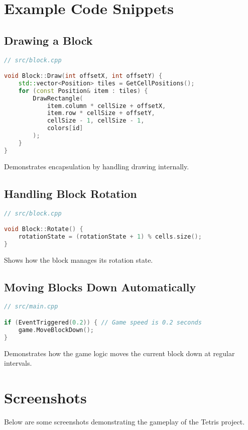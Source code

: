 \documentclass{article}
\begin{document}
\section{Example Code Snippets}

\subsection{Drawing a Block}

\begin{lstlisting}[language=C++]
// src/block.cpp

void Block::Draw(int offsetX, int offsetY) {
    std::vector<Position> tiles = GetCellPositions();
    for (const Position& item : tiles) {
        DrawRectangle(
            item.column * cellSize + offsetX,
            item.row * cellSize + offsetY,
            cellSize - 1, cellSize - 1,
            colors[id]
        );
    }
}
\end{lstlisting}

Demonstrates encapsulation by handling drawing internally.

\subsection{Handling Block Rotation}

\begin{lstlisting}[language=C++]
// src/block.cpp

void Block::Rotate() {
    rotationState = (rotationState + 1) % cells.size();
}
\end{lstlisting}

Shows how the block manages its rotation state.

\subsection{Moving Blocks Down Automatically}

\begin{lstlisting}[language=C++]
// src/main.cpp

if (EventTriggered(0.2)) { // Game speed is 0.2 seconds
    game.MoveBlockDown();
}
\end{lstlisting}

Demonstrates how the game logic moves the current block down at regular intervals.

\section{Screenshots}
Below are some screenshots demonstrating the gameplay of the Tetris project.
\end{document}
